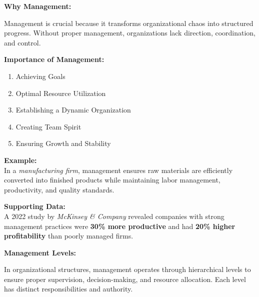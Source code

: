 \documentclass[10pt,a4paper]{book}
\begin{document}
\textbf{Why Management:}

Management is crucial because it transforms organizational chaos into structured progress. Without proper management, organizations lack direction, coordination, and control.

\textbf{Importance of Management:}
\begin{enumerate}
    \item Achieving Goals
    \item Optimal Resource Utilization
    \item Establishing a Dynamic Organization
    \item Creating Team Spirit
    \item Ensuring Growth and Stability
\end{enumerate}

\textbf{Example:}\\
In a \textit{manufacturing firm}, management ensures raw materials are efficiently converted into finished products while maintaining labor management, productivity, and quality standards.

\textbf{Supporting Data:}\\
A 2022 study by \textit{McKinsey \& Company} revealed companies with strong management practices were \textbf{30\% more productive} and had \textbf{20\% higher profitability} than poorly managed firms.


\textbf{Management Levels:}

In organizational structures, management operates through hierarchical levels to ensure proper supervision, decision-making, and resource allocation. Each level has distinct responsibilities and authority.
\end{document}
